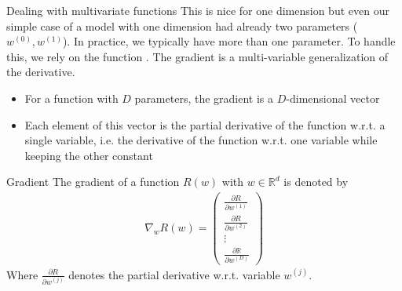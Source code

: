 	\begin{parag}{Dealing with multivariate functions}
	    This is nice for one dimension but even our simple case of a model with one dimension had already two parameters ($w^{\left(0\right)}, w^{\left(1\right)}$). In practice, we typically have more than one parameter. To handle this, we rely on the function . The gradient is a multi-variable generalization of the derivative.\\
		\begin{itemize}
			\item For a function with $D$ parameters, the gradient is a $D$-dimensional vector
			\item Each element of this vector is the partial derivative of the function w.r.t. a single variable, i.e. the derivative of the function w.r.t. one variable while keeping the other constant
		\end{itemize}
		\begin{definition}{Gradient}
		The gradient of a function $R\left(w\right)$ with $w \in \mathbb{R}^{d}$ is denoted by
		\begin{align*} 
			\nabla_w R\left(w\right) = \begin{pmatrix} \frac{\partial R}{\partial w^{\left(1\right)}}  \\ \frac{\partial R}{\partial w^{\left(2\right)}}  \\ \vdots \\ \frac{\partial \mathbb{R}}{\partial w^{\left(D\right)}}  \end{pmatrix} 
		\end{align*}
		Where $\frac{\partial R}{\partial w^{\left(j\right)}} $ denotes the partial derivative w.r.t. variable $w^{\left(j\right)}$.
		\end{definition}
		
	\end{parag}
	



